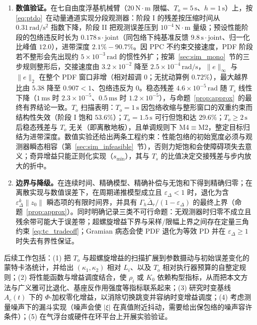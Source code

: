 \begin{enumerate}
  \item \textbf{数值验证。}在七自由度浮基机械臂（\(20\,\mathrm{N\cdot m}\) 限幅、\(T_o=5\,\mathrm{s}\)、\(h=1\,\mathrm{s}\)）上，按 \eqref{eq:ptdo}~在动量通道实现分段观测器：阶段 I 的残差按压缩时间从 \(0.31\,\mathrm{rad/s^2}\) 指数下降，阶段 II 把观测误差压到 \(10^{-4}\,\mathrm{N\cdot m}\) 量级；预设性能阶段的包络违反时长为 \(0.178\,\mathrm{s\cdot joint}\)（同包络下纯基准反馈 \(9.8\,\mathrm{s\cdot joint}\)、归一化比峰值 \(12.0\)），进带深度 \(2.1\%\!-\!90.7\%\)。因 PPC 不约束交接速度，PDF 阶段若不整形会先出现约 \(5\times10^{-3}\,\mathrm{rad}\) 的惯性外扩；按第~\ref{sec:sim_mono}~节的三步规则整形后，交接速度由 \(3.2\times10^{-2}\) 降至 \(2.5\times10^{-4}\,\mathrm{rad/s}\)，\(\lVert e\rVert_\infty\) 与 \(\lVert e\rVert_2\) 在整个 PDF 窗口非增（相对超调 0；无扰动算例 \(0.72\%\)），最大越界比由 \(5.38\) 降至 \(0.907<1\)、包络违反为 0。稳态残差 \(4.6\times10^{-5}\,\mathrm{rad}\) 随 \(T_s\) 线性下降（\(1\,\mathrm{ms}\) 时 \(2.3\times10^{-5}\)、\(0.5\,\mathrm{ms}\) 时 \(1.2\times10^{-5}\)），与命题~\ref{prop:approx}~的最终有界结论一致。\(T_o\) 扫描表明：\(T_o=1\,\mathrm{s}\) 因包络收缩与整形窗口的双重约束而结构性失效（阶段 I 饱和 \(53.6\%\)）；\(T_o=1.5\,\mathrm{s}\) 可行但饱和达 \(29.6\%\)；\(T_o\ge2\,\mathrm{s}\) 后稳态残差与 \(T_o\) 无关（即离散地板），且单调规则下 M4\(\equiv\)M2，整定目标归结为进带深度。数值实验还给出两条工程约束：性能包络的初始宽度必须与观测器瞬态相容（第~\ref{sec:sim_infeasible}~节），否则力矩饱和会使障碍项失去意义；奇异增益只能正则化实现（\(s_{\min}\)），其与 \(T_s\) 的比值决定交接残差与步内放大的折中。
  \item \textbf{边界与降级。}在连续时间、精确模型、精确补偿与无饱和下得到精确归零；在离散实现与数值误差下，在周期递推模型成立且 \(\varepsilon_\Delta<1\) 时，退化为含 \(\varepsilon_\Delta^k\lVert z_0\rVert\) 瞬态项的有限时间界，并具有 \(\Gamma_h\bar\Delta_r/(1-\varepsilon_\Delta)\) 的最终上界（命题~\ref{prop:approx}）。同时明确记录三类不可行命题：无观测器时归零不成立且残余带可能大于误差带；超螺旋增益下界与采样/限幅上界之间存在定量三角约束 \eqref{eq:tc_tradeoff}；Gramian 病态会使 PDF 退化为等效 PD 并在 \(\varepsilon_\Delta\ge1\) 时失去有界性保证。
\end{enumerate}

后续工作包括：\textup{(1)} 把 \(T_o\) 与超螺旋增益的扫描扩展到参数摄动与初始误差变化的蒙特卡洛统计，并给出 \((\kappa_1,\kappa_2)\) 相对 \(L_i\)、以及 \(T_o\) 相对执行器预算的自整定规则；\textup{(2)} 将性能函数与增益调度结合，使 \(\rho_i\) 或 \(K_0\) 依赖构型指标，从而把本文方法与广义雅可比退化、基座反作用强度等指标联系起来；\textup{(3)} 研究时变基线 \(A_c(t)\) 下的 \(\Phi\)-加权零化增益，以消除切换跳变并容纳时变增益调度；\textup{(4)} 考虑测量噪声下的漏斗实现（噪声会使 \(\lvert\xi\rvert\) 在真值附近抖动，需要给出保包络的噪声容许条件）；\textup{(5)} 在气浮台或硬件在环平台上开展实验验证。
